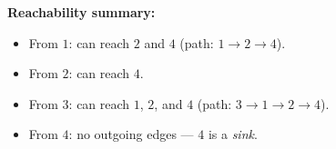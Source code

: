 \documentclass[12pt, a4paper]{article}
\begin{document}
\medskip

\textbf{Reachability summary:}
\begin{itemize}[nosep]
  \item From $1$: can reach $2$ and $4$ \;(path: $1 \to 2 \to 4$).
  \item From $2$: can reach $4$.
  \item From $3$: can reach $1$, $2$, and $4$ \;(path: $3 \to 1 \to 2 \to 4$).
  \item From $4$: no outgoing edges --- $4$ is a \emph{sink}.
\end{itemize}
\end{document}
